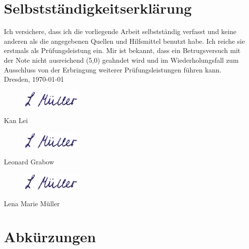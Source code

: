 \documentclass[10pt,a4paper, ngerman]{article}
\begin{document}
\section*{Selbstständigkeitserklärung}
Ich versichere, dass ich die vorliegende Arbeit selbstständig verfasst und keine anderen als die angegebenen Quellen und Hilfsmittel benutzt habe. Ich reiche sie erstmals als Prüfungsleistung ein. Mir ist bekannt, dass ein Betrugsversuch mit der Note \glqq nicht ausreichend\grqq{} (5,0) geahndet wird und im Wiederholungsfall zum Ausschluss von der Erbringung weiterer Prüfungsleistungen führen kann.\\
\vskip 1cm
\noindent Dresden, \today 
\vskip 0.5cm
\begin{figure}[H]
\includegraphics[width=3cm, keepaspectratio, left]{../figures/unterschrift_lena.jpeg}
\end{figure}
\noindent Kan Lei
\vskip 0.5cm
\begin{figure}[H]
\includegraphics[width=3cm, keepaspectratio, left]{../figures/unterschrift_lena.jpeg}
\end{figure}
\noindent Leonard Grabow
\vskip 0.5cm
\begin{figure}[H]
\includegraphics[width=3cm, keepaspectratio, left]{../figures/unterschrift_lena.jpeg}
\end{figure}
\noindent Lena Marie Müller

\newpage
\pagestyle{empty}
\tableofcontents
\pagestyle{empty}

\pagestyle{fancy}
\fancyhf{}
\fancyhead[R]{\thepage}
\renewcommand{\headrulewidth}{0.4pt}

\newpage
{}
\printunsrtglossary[type=symbols] 

\newpage
\section*{Abkürzungen}\label{sec:abkuerzungen}
\begin{acronym}[Bash]
\end{acronym}
\end{document}
